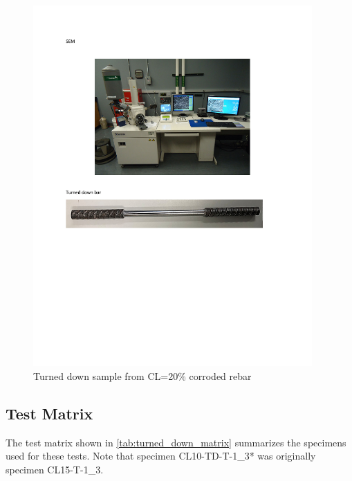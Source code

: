 \begin{figure}[htbp]
    \centering
    \includegraphics[width=0.95\textwidth]{VAC Thesis 2.0/Chapter-3/figs/turned_down_bar.pdf}
    \caption{Turned down sample from CL=20\% corroded rebar}
    \label{fig:turned_down_bar}
\end{figure}


\subsection{Test Matrix}

The test matrix shown in \ref{tab:turned_down_matrix} summarizes the specimens used for these tests. Note that specimen CL10-TD-T-1\_3* was originally specimen CL15-T-1\_3.

